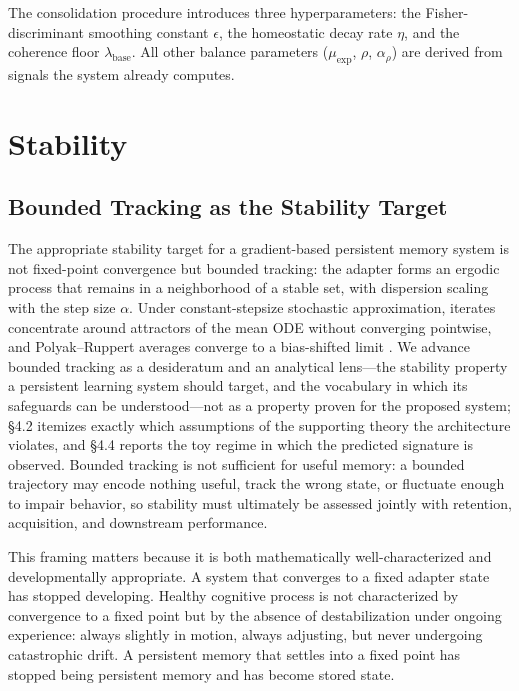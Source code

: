\documentclass[11pt]{article}
\begin{document}
The consolidation procedure introduces three hyperparameters: the Fisher-discriminant smoothing constant $\epsilon$, the homeostatic decay rate $\eta$, and the coherence floor $\lambda_\text{base}$. All other balance parameters ($\mu_\text{exp}$, $\rho$, $\alpha_\rho$) are derived from signals the system already computes.


\section{Stability}

\subsection{Bounded Tracking as the Stability Target}

The appropriate stability target for a gradient-based persistent memory system is not fixed-point convergence but bounded tracking: the adapter forms an ergodic process that remains in a neighborhood of a stable set, with dispersion scaling with the step size $\alpha$. Under constant-stepsize stochastic approximation, iterates concentrate around attractors of the mean ODE without converging pointwise, and Polyak--Ruppert averages converge to a bias-shifted limit \cite{borkar2008, lauand2023, mou2020}. We advance bounded tracking as a desideratum and an analytical lens---the stability property a persistent learning system should target, and the vocabulary in which its safeguards can be understood---not as a property proven for the proposed system; \S 4.2 itemizes exactly which assumptions of the supporting theory the architecture violates, and \S 4.4 reports the toy regime in which the predicted signature is observed. Bounded tracking is not sufficient for useful memory: a bounded trajectory may encode nothing useful, track the wrong state, or fluctuate enough to impair behavior, so stability must ultimately be assessed jointly with retention, acquisition, and downstream performance.

This framing matters because it is both mathematically well-characterized and developmentally appropriate. A system that converges to a fixed adapter state has stopped developing. Healthy cognitive process is not characterized by convergence to a fixed point but by the absence of destabilization under ongoing experience: always slightly in motion, always adjusting, but never undergoing catastrophic drift. A persistent memory that settles into a fixed point has stopped being persistent memory and has become stored state.
\end{document}
